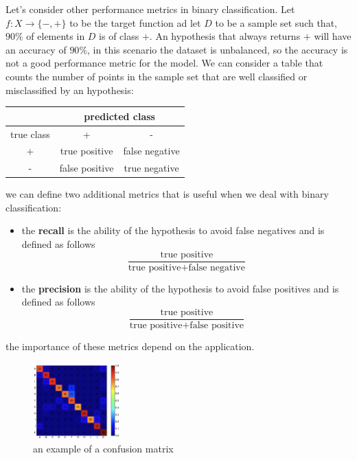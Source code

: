 \documentclass[10pt, letterpaper]{report}
\begin{document}
Let's consider other performance metrics in binary classification. Let $f:X\rightarrow\{-,+\}$ to be the target function ad let $D$ to be a sample set such that, $90\%$ of elements in $D$ is of class $+$. An hypothesis that always returns $+$ will have an accuracy of $90\%$, in this scenario the dataset is unbalanced, so the accuracy is not a good performance metric for the model. We can consider a table that counts the number of points in the sample set that are well classified or misclassified by an hypothesis:\begin{center}
	\begin{tabular}{c|cc|}
		\cline{2-3}
		                                 & \multicolumn{2}{c|}{predicted class}                  \\ \hline
		\multicolumn{1}{|c|}{true class} & \multicolumn{1}{c|}{+}               & -              \\ \hline
		\multicolumn{1}{|c|}{+}          & \multicolumn{1}{c|}{true positive}   & false negative \\ \hline
		\multicolumn{1}{|c|}{-}          & \multicolumn{1}{c|}{false positive}  & true negative  \\ \hline
	\end{tabular}
\end{center}
we can define two additional metrics that is useful when we deal with binary classification:\begin{itemize}
	\item the \textbf{recall} is the ability of the hypothesis to avoid false negatives and is defined as follows\begin{equation}
		      \frac{\text{true positive}}{\text{true positive}+\text{false negative}}
	      \end{equation}
	\item the \textbf{precision} is the ability of the hypothesis to avoid false positives and is defined as follows\begin{equation}
		      \frac{\text{true positive}}{\text{true positive}+\text{false positive}}
	      \end{equation}
\end{itemize}
the importance of these metrics depend on the application.
\bigskip
\begin{figure}[h!]
	\centering
	\includegraphics[width=0.3\textwidth]{images/conf_matrix.png}
	\caption{an example of a confusion matrix}
	\label{img:conf_matrix}
\end{figure}\bigskip
\end{document}
